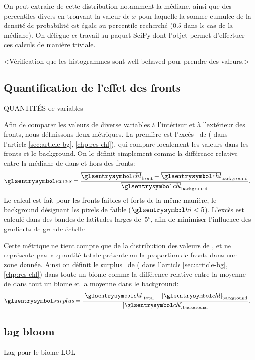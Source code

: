 On peut extraire de cette distribution notamment la médiane, ainsi que des percentiles divers en trouvant la valeur de \(x\) pour laquelle la somme cumulée de la densité de probabilité est égale au percentile recherché (0.5 dans le cas de la médiane).
On délègue ce travail au paquet SciPy dont l'objet  permet d'effectuer ces calculs de manière triviale.

<Vérification que les histogrammes sont well-behaved pour prendre des valeurs.>

\subsection{Quantification de l'effet des fronts}
\label{sec:extraction-surplus}

QUANTITÉS de variables

Afin de comparer les valeurs de diverse variables à l'intérieur et à l'extérieur des fronts, nous définissons deux métriques.
La première est l'excès~ de  ( dans l'article \cref{sec:article-bg}, \cref*{chp:res-chl}), qui compare localement les valeurs dans les fronts et le background. On le définit simplement comme la différence relative entre la médiane de  dans et hors des fronts:
\begin{equation}
  \am{exces} = \frac{\med{\am{chl}}_\frt - \med{\am{chl}}_\bkg}
  {\med{\am{chl}}_\bkg} .
\end{equation}
Le calcul est fait pour les fronts faibles et forts de la même manière, le background désignant les pixels de  faible (\(\am{hi} < 5\)).
L'excès est calculé dans des bandes de latitudes larges de~\ang{5}, afin de minimiser l'influence des gradients de grande échelle.

Cette métrique ne tient compte que de la distribution des valeurs de , et ne représente pas la quantité totale présente ou la proportion de fronts dans une zone donnée.
Ainsi on définit le surplus~ de  ( dans l'article \cref{sec:article-bg}, \cref*{chp:res-chl}) dans toute un biome comme la différence relative entre la moyenne de  dans tout un biome et la moyenne dans le background:
\begin{equation}
  \am{surplus} = \frac{\moy{\am{chl}}_\tot - \moy{\am{chl}}_\bkg}
  {\moy{\am{chl}}_\bkg} .
\end{equation}

\subsection{lag bloom}
Lag pour le biome
LOL
